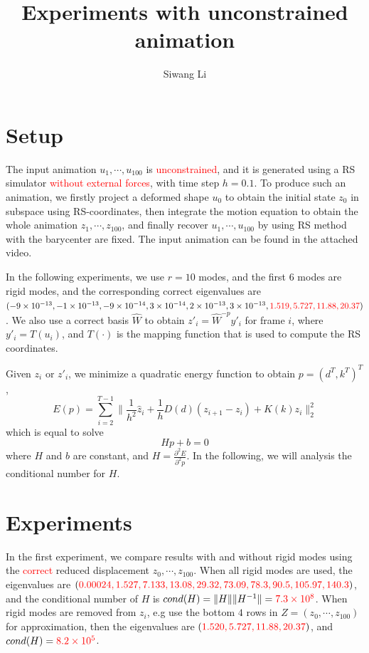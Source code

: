 \documentclass[9pt,twocolumn]{extarticle}
\title{Experiments with unconstrained animation}
\author{Siwang Li}
\newcommand{\TODO}[1]{\textcolor{red}{#1}}
\begin{document}
\maketitle

\setlength{\parskip}{0.5ex}

\section{Setup}
The input animation $u_1,\cdots,u_{100}$ is \TODO{unconstrained}, and it is
generated using a RS simulator \TODO{without external forces}, with time step
$h=0.1$. To produce such an animation, we firstly project a deformed shape $u_0$
to obtain the initial state $z_0$ in subspace using RS-coordinates, then
integrate the motion equation to obtain the whole animation
$z_1,\cdots,z_{100}$, and finally recover $u_1,\cdots,u_{100}$ by using RS
method with the barycenter are fixed. The input animation can be found in the
attached video.

In the following experiments, we use $r=10$ modes, and the first $6$ modes are
rigid modes, and the corresponding correct eigenvalues are $(-9\times
10^{-13},-1\times 10^{-13},-9\times 10^{-14},3\times 10^{-14},2\times
10^{-13},3\times 10^{-13},\TODO{1.519,5.727,11.88, 20.37})$. We also use a
correct basis $\hat{W}$ to obtain $z'_i=\hat{W}^{-p}y'_i$ for frame $i$, where
$y'_i=T(u_i)$, and $T(\cdot)$ is the mapping function that is used to compute
the RS coordinates.

Given $z_i$ or $z'_i$, we minimize a quadratic energy function to obtain
$p=(d^T,k^T)^T$,
\begin{equation} \label{qua-en}
  E(p) = \sum_{i=2}^{T-1} \|\frac{1}{h^2}\hat{z}_i+\frac{1}{h}{D}(d)(z_{i+1}-z_{i})+ K(k)z_i\|_2^2
\end{equation}
which is equal to solve
\begin{equation} \label{leq}
  Hp + b = 0
\end{equation}
where $H$ and $b$ are constant, and $H=\frac{\partial^2{E}}{\partial^2{p}}$.  In
the following, we will analysis the conditional number for $H$.

\section{Experiments}
In the first experiment, we compare results with and without rigid modes using
the \TODO{correct} reduced displacement $z_0,\cdots,z_{100}$.  When all rigid
modes are used, the eigenvalues are
$(\TODO{0.00024,1.527,7.133,13.08,29.32,73.09,78.3,90.5,105.97,140.3})$, and the
conditional number of $H$ is $cond(H)=\|H\|\|H^{-1}\|=\TODO{7.3\times
  10^{8}}$. When rigid modes are removed from $z_i$, e.g use the bottom $4$ rows
in $Z=(z_0,\cdots,z_{100})$ for approximation, then the eigenvalues are
$(\TODO{1.520, 5.727, 11.88, 20.37})$, and $cond(H)=\TODO{8.2\times 10^{5}}$.
\end{document}
